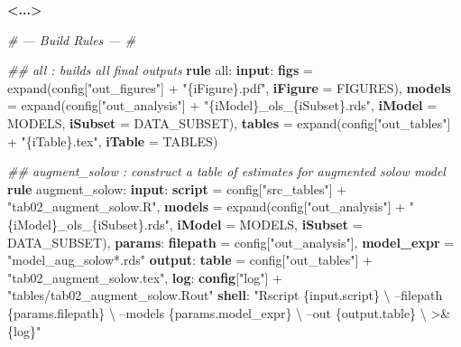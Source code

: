 \documentclass[]{book}
\newenvironment{Shaded}{\begin{snugshade}}{\end{snugshade}}
\newcommand{\KeywordTok}[1]{\textcolor[rgb]{0.13,0.29,0.53}{\textbf{{#1}}}}
\newcommand{\StringTok}[1]{\textcolor[rgb]{0.31,0.60,0.02}{{#1}}}
\newcommand{\CommentTok}[1]{\textcolor[rgb]{0.56,0.35,0.01}{\textit{{#1}}}}
\newcommand{\NormalTok}[1]{{#1}}
\theoremstyle{definition}
\theoremstyle{definition}
\theoremstyle{definition}
\theoremstyle{remark}
\begin{document}
\begin{Shaded}
\begin{Highlighting}[]
\KeywordTok{<...>}

\CommentTok{# --- Build Rules --- #}

\CommentTok{## all                : builds all final outputs}
\KeywordTok{rule} \NormalTok{all:}
    \KeywordTok{input}\NormalTok{:}
        \KeywordTok{figs}   \NormalTok{= expand(config[}\StringTok{"out_figures"}\NormalTok{] + }\StringTok{"\{iFigure\}.pdf"}\NormalTok{,}
                            \KeywordTok{iFigure} \NormalTok{= FIGURES),}
        \KeywordTok{models} \NormalTok{= expand(config[}\StringTok{"out_analysis"}\NormalTok{] + }\StringTok{"\{iModel\}_ols_\{iSubset\}.rds"}\NormalTok{,}
                            \KeywordTok{iModel} \NormalTok{= MODELS,}
                            \KeywordTok{iSubset} \NormalTok{= DATA_SUBSET),}
        \KeywordTok{tables}  \NormalTok{= expand(config[}\StringTok{"out_tables"}\NormalTok{] + }\StringTok{"\{iTable\}.tex"}\NormalTok{,}
                            \KeywordTok{iTable} \NormalTok{= TABLES)}

\CommentTok{## augment_solow      : construct a table of estimates for augmented solow model}
\KeywordTok{rule} \NormalTok{augment_solow:}
    \KeywordTok{input}\NormalTok{:}
        \KeywordTok{script} \NormalTok{= config[}\StringTok{"src_tables"}\NormalTok{] + }\StringTok{"tab02_augment_solow.R"}\NormalTok{,}
        \KeywordTok{models} \NormalTok{= expand(config[}\StringTok{"out_analysis"}\NormalTok{] + }\StringTok{"\{iModel\}_ols_\{iSubset\}.rds"}\NormalTok{,}
                            \KeywordTok{iModel} \NormalTok{= MODELS,}
                            \KeywordTok{iSubset} \NormalTok{= DATA_SUBSET),}
    \KeywordTok{params}\NormalTok{:}
        \KeywordTok{filepath}   \NormalTok{= config[}\StringTok{"out_analysis"}\NormalTok{],}
        \KeywordTok{model_expr} \NormalTok{= }\StringTok{"model_aug_solow*.rds"}
    \KeywordTok{output}\NormalTok{:}
        \KeywordTok{table} \NormalTok{= config[}\StringTok{"out_tables"}\NormalTok{] + }\StringTok{"tab02_augment_solow.tex"}\NormalTok{,}
    \KeywordTok{log}\NormalTok{:}
        \KeywordTok{config}\NormalTok{[}\StringTok{"log"}\NormalTok{] + }\StringTok{"tables/tab02_augment_solow.Rout"}
    \KeywordTok{shell}\NormalTok{:}
        \StringTok{"Rscript \{input.script\} \textbackslash{}}
\StringTok{            --filepath \{params.filepath\} \textbackslash{}}
\StringTok{            --models \{params.model_expr\} \textbackslash{}}
\StringTok{            --out \{output.table\} \textbackslash{}}
\StringTok{            >& \{log\}"}


\end{Highlighting}
\end{Shaded}
\end{document}
